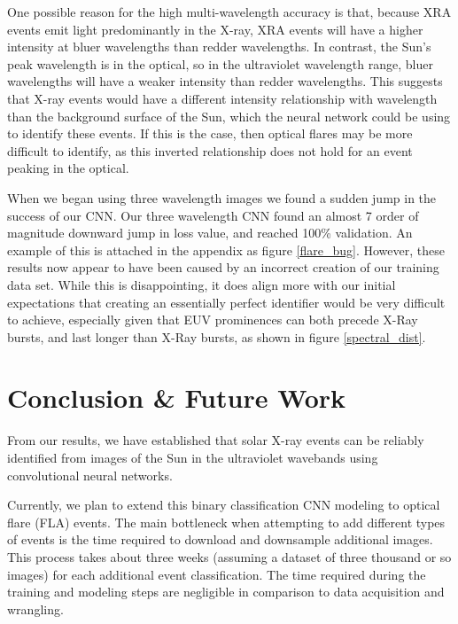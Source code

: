 \documentclass[12pt, letterpaper]{article}
\begin{document}
One possible reason for the high multi-wavelength accuracy is that, because XRA events emit light predominantly in the X-ray, XRA events will have a higher intensity at bluer wavelengths than redder wavelengths. In contrast, the Sun's peak wavelength is in the optical, so in the ultraviolet wavelength range, bluer wavelengths will have a weaker intensity than redder wavelengths. This suggests that X-ray events would have a different intensity relationship with wavelength than the background surface of the Sun, which the neural network could be using to identify these events. If this is the case, then optical flares may be more difficult to identify, as this inverted relationship does not hold for an event peaking in the optical.

When we began using three wavelength images we found a sudden jump in the success of our CNN. Our three wavelength CNN found an almost 7 order of magnitude downward jump in loss value, and reached 100\% validation. An example of this is attached in the appendix as figure \ref{flare_bug}. However, these results now appear to have been caused by an incorrect creation of our training data set. While this is disappointing, it does align more with our initial expectations that creating an essentially perfect identifier would be very difficult to achieve, especially given that EUV prominences can both precede X-Ray bursts, and last longer than X-Ray bursts, as shown in figure \ref{spectral_dist}. 


\section*{Conclusion \& Future Work}

From our results, we have established that solar X-ray events can be reliably identified from images of the Sun in the ultraviolet wavebands using convolutional neural networks. 

Currently, we plan to extend this binary classification CNN modeling to optical flare (FLA) events. The main bottleneck when attempting to add different types of events is the time required to download and downsample additional images. This process takes about three weeks (assuming a dataset of three thousand or so images) for each additional event classification. The time required during the training and modeling steps are negligible in comparison to data acquisition and wrangling. 
\end{document}
